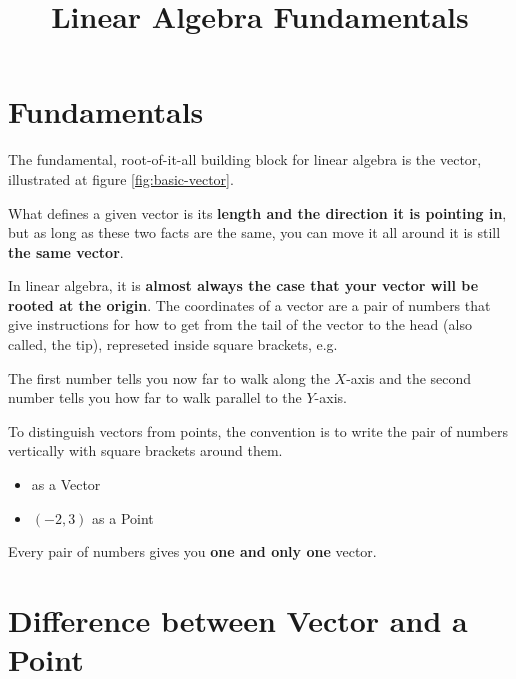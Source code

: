 \documentclass[12pt]{article}
\title{Linear Algebra Fundamentals}
\date{}
\begin{document}
    \maketitle

    \tableofcontents

\newpage

\section{Fundamentals}

The fundamental, root-of-it-all building block for linear algebra is the vector, illustrated at figure \ref{fig:basic-vector}.


What defines a given vector is its \textbf{length and the direction it is pointing in}, but as long as these two facts are the same, you can move it all around it is still \textbf{the same vector}.


In linear algebra, it is \textbf{almost always the case that your vector will be rooted at the origin}. The coordinates of a vector are a pair of numbers that give instructions for how to get from the tail of the vector to the head (also called, the tip), represeted inside square brackets, e.g. 

The first number tells you now far to walk along the $X$-axis and the second number tells you how far to walk parallel to the $Y$-axis.

To distinguish vectors from points, the convention is to write the pair of numbers vertically with square brackets around them.

\begin{itemize}
    \item {} as a Vector
    \item $ (-2, 3) $ as a Point
\end{itemize}

Every pair of numbers gives you \textbf{one and only one} vector.


\section{Difference between Vector and a Point}
\end{document}

